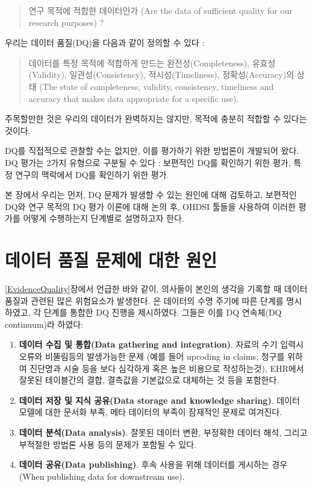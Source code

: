 \documentclass[11pt]{book}
\providecommand{\tightlist}{%
  \setlength{\itemsep}{0pt}\setlength{\parskip}{0pt}}
\theoremstyle{definition}
\theoremstyle{definition}
\theoremstyle{definition}
\theoremstyle{remark}
\begin{document}
\begin{quote}
연구 목적에 적합한 데이터인가 (Are the data of sufficient quality for
our research purposes) ?
\end{quote}

우리는 데이터 품질(DQ)을 다음과 같이 정의할 수 있다
\citep{roebuck_2012}: 

\begin{quote}
데이터를 특정 목적에 적합하게 만드는 완전성(Completeness),
유효성(Validity), 일관성(Consistency), 적시성(Timeliness),
정확성(Accuracy)의 상태 (The state of completeness, validity,
consistency, timeliness and accuracy that makes data appropriate for a
specific use).
\end{quote}

주목할만한 것은 우리의 데이터가 완벽하지는 않지만, 목적에 충분히 적합할
수 있다는 것이다.

DQ를 직접적으로 관찰할 수는 없지만, 이를 평가하기 위한 방법론이 개발되어
왔다. DQ 평가는 2가지 유형으로 구분될 수 있다 \citep{weiskopf_2013}:
보편적인 DQ를 확인하기 위한 평가, 특정 연구의 맥락에서 DQ를 확인하기
위한 평가.

본 장에서 우리는 먼저, DQ 문제가 발생할 수 있는 원인에 대해 검토하고,
보편적인 DQ와 연구 목적의 DQ 평가 이론에 대해 논의 후, OHDSI 툴들을
사용하여 이러한 평가를 어떻게 수행하는지 단계별로 설명하고자 한다.

\section{데이터 품질 문제에 대한 원인}\label{----}

\ref{EvidenceQuality}장에서 언급한 바와 같이, 의사들이 본인의 생각을
기록할 때 데이터 품질과 관련된 많은 위험요소가 발생한다.
\citet{dasu_2003} 은 데이터의 수명 주기에 따른 단계를 명시하였고, 각
단계를 통합한 DQ 진행을 제시하였다. 그들은 이를 DQ 연속체(DQ
continuum)라 하였다:

\begin{enumerate}
\def\labelenumi{\arabic{enumi}.}
\tightlist
\item
  \textbf{데이터 수집 및 통합(Data gathering and integration)}. 자료의
  수기 입력시 오류와 비뚤림등의 발생가능한 문제 (예를 들어 upcoding in
  claims; 청구를 위하여 진단명과 시술 등을 보다 심각하게 혹은 높은
  비용으로 작성하는것), EHR에서 잘못된 테이블간의 결합, 결측값을
  기본값으로 대체하는 것 등을 포함한다.
\item
  \textbf{데이터 저장 및 지식 공유(Data storage and knowledge sharing)}.
  데이터 모델에 대한 문서화 부족, 메타 데이터의 부족이 잠재적인 문제로
  여겨진다.
\item
  \textbf{데이터 분석(Data analysis)}. 잘못된 데이터 변환, 부정확한
  데이터 해석, 그리고 부적절한 방법론 사용 등의 문제가 포함될 수 있다.
\item
  \textbf{데이터 공유(Data publishing)}. 후속 사용을 위해 데이터를
  게시하는 경우 (When publishing data for downstream use).
\end{enumerate}
\end{document}
